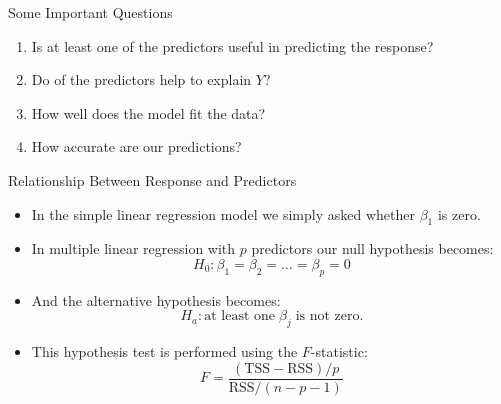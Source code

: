 \documentclass[mathserif, aspectratio=169]{beamer}
\begin{document}
\begin{frame}{Some Important Questions}
	\begin{enumerate}
		\item Is at least one of the predictors useful in predicting the response?
		\item Do  of the predictors help to explain $Y$? 
		\item How well does the model fit the data?
		\item How accurate are our predictions?
	\end{enumerate}
\end{frame}


\begin{frame}{Relationship Between Response and Predictors}
	\begin{itemize}
		\item In the simple linear regression model we simply asked whether $\beta_1$ is zero.
		\item In multiple linear regression with $p$ predictors our null hypothesis becomes:
			\[ H_0: \beta_1 = \beta_2 = \dots = \beta_p = 0 \]
		\item And the alternative hypothesis becomes:
			\[ H_a: \text{at least one}\; \beta_j\; \text{is not zero.} \]
		\item This hypothesis test is performed using the $F$-statistic:
			\[
				F = \frac{(\text{TSS} - \text{RSS}) / p}{\text{RSS}/(n - p -1)}
			\]
	\end{itemize}
\end{frame}
\end{document}
